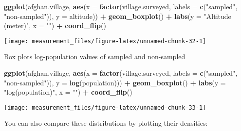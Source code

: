 \documentclass[]{book}
\newenvironment{Shaded}{\begin{snugshade}}{\end{snugshade}}
\newcommand{\KeywordTok}[1]{\textcolor[rgb]{0.13,0.29,0.53}{\textbf{#1}}}
\newcommand{\DataTypeTok}[1]{\textcolor[rgb]{0.13,0.29,0.53}{#1}}
\newcommand{\StringTok}[1]{\textcolor[rgb]{0.31,0.60,0.02}{#1}}
\newcommand{\OperatorTok}[1]{\textcolor[rgb]{0.81,0.36,0.00}{\textbf{#1}}}
\newcommand{\NormalTok}[1]{#1}
\theoremstyle{definition}
\theoremstyle{definition}
\theoremstyle{definition}
\theoremstyle{remark}
\begin{document}
\begin{Shaded}
\begin{Highlighting}[]
\KeywordTok{ggplot}\NormalTok{(afghan.village, }\KeywordTok{aes}\NormalTok{(}\DataTypeTok{x =} \KeywordTok{factor}\NormalTok{(village.surveyed,}
                                      \DataTypeTok{labels =} \KeywordTok{c}\NormalTok{(}\StringTok{"sampled"}\NormalTok{, }\StringTok{"non-sampled"}\NormalTok{)),}
                           \DataTypeTok{y =}\NormalTok{ altitude)) }\OperatorTok{+}
\StringTok{  }\KeywordTok{geom_boxplot}\NormalTok{() }\OperatorTok{+}
\StringTok{  }\KeywordTok{labs}\NormalTok{(}\DataTypeTok{y =} \StringTok{"Altitude (meter)"}\NormalTok{, }\DataTypeTok{x =} \StringTok{""}\NormalTok{) }\OperatorTok{+}
\StringTok{  }\KeywordTok{coord_flip}\NormalTok{()}
\end{Highlighting}
\end{Shaded}

\begin{center}\texttt{[image: measurement\_files/figure-latex/unnamed-chunk-32-1]} \end{center}

Box plots log-population values of sampled and non-sampled

\begin{Shaded}
\begin{Highlighting}[]
\KeywordTok{ggplot}\NormalTok{(afghan.village, }\KeywordTok{aes}\NormalTok{(}\DataTypeTok{x =} \KeywordTok{factor}\NormalTok{(village.surveyed,}
                                      \DataTypeTok{labels =} \KeywordTok{c}\NormalTok{(}\StringTok{"sampled"}\NormalTok{, }\StringTok{"non-sampled"}\NormalTok{)),}
                           \DataTypeTok{y =} \KeywordTok{log}\NormalTok{(population))) }\OperatorTok{+}
\StringTok{  }\KeywordTok{geom_boxplot}\NormalTok{() }\OperatorTok{+}
\StringTok{  }\KeywordTok{labs}\NormalTok{(}\DataTypeTok{y =} \StringTok{"log(population)"}\NormalTok{, }\DataTypeTok{x =} \StringTok{""}\NormalTok{) }\OperatorTok{+}
\StringTok{  }\KeywordTok{coord_flip}\NormalTok{()}
\end{Highlighting}
\end{Shaded}

\begin{center}\texttt{[image: measurement\_files/figure-latex/unnamed-chunk-33-1]} \end{center}

You can also compare these distributions by plotting their densities:
\end{document}
